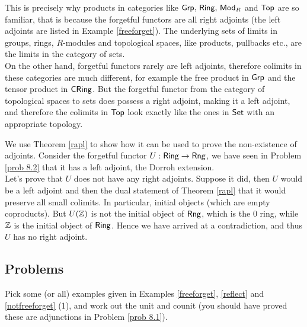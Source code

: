 \vspace*{0.1in}

\begin{discussion}
This is precisely why products in categories like $\mathsf{Grp},\,\mathsf{Ring},\,\mathsf{Mod}_R$ and $\mathsf{Top}$ are so familiar, that is because the forgetful functors are all right adjoints (the left adjoints are listed in Example \ref{freeforget}). The underlying sets of limits in groups, rings, $R$-modules and topological spaces, like products, pullbacks etc., are the limits in the category of sets.\\[0.5em]
On the other hand, forgetful functors rarely are left adjoints, therefore colimits in these categories are much different, for example the free product in $\mathsf{Grp}$ and the tensor product in $\mathsf{CRing}$. But the forgetful functor from the category of topological spaces to sets does possess a right adjoint, making it a left adjoint, and therefore the colimits in $\mathsf{Top}$ look exactly like the ones in $\mathsf{Set}$ with an appropriate topology. 
\end{discussion}

\vspace*{0.1in}

\begin{example}
We use Theorem \ref{rapl} to show how it can be used to prove the non-existence of adjoints. Consider the forgetful functor $U:\mathsf{Ring} \to \mathsf{Rng}$, we have seen in Problem \ref{prob 8.2} that it has a left adjoint, the Dorroh extension.\\[0.5em]
Let's prove that $U$ does not have any right adjoints. Suppose it did, then $U$ would be a left adjoint and then the dual statement of Theorem \ref{rapl} that it would preserve all small colimits. In particular, initial objects (which are empty coproducts). But $U(\mathbb Z)$ is not the initial object of $\mathsf{Rng}$, which is the $0$ ring, while $\mathbb Z$ is the initial object of $\mathsf{Ring}$. Hence we have arrived at a contradiction, and thus $U$ has no right adjoint. 
\end{example}

\vspace*{0.2in}

\subsection{Problems}\vspace{0.1in}

\begin{problem}\label{prob 9.1}
Pick some (or all) examples given in Examples \ref{freeforget}, \ref{reflect} and \ref{notfreeforget} (1), and work out the unit and counit (you should have proved these are adjunctions in Problem \ref{prob 8.1}).
\end{problem}

